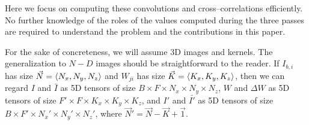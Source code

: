   Here we focus on computing these convolutions and
  cross--correlations efficiently.  No further knowledge of the roles
  of the values computed during the three passes are required to
  understand the problem and the contributions in this paper.



  For the sake of concreteness, we will assume 3D images and
  kernels. The generalization to $N-D$ images should be
  straightforward to the reader.
  If $I_{b,i}$ has size $\vec{N} = \langle N_x, N_y, N_z\rangle$ and
  $W_{ji}$ has size $\vec{K} = \langle K_x,K_y,K_z\rangle$, then we can
  regard $I$ and $\bar{I}$ as 5D tensors of size $B \times F \times N_x
  \times N_y \times N_z$, $W$ and $\Delta W$ as 5D tensors of size $F'
  \times F \times K_x \times K_y \times K_z$, and $I'$ and $\bar{I'}$ as
  5D tensors of size $B \times F' \times N_x' \times N_y' \times N_z'$,
  where $\vec{N}' = \vec{N} - \vec{K} + \vec{1}$.

